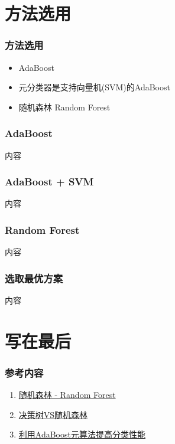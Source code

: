 \documentclass[aspectratio=43, 12pt, utf8, mathserif]{ctexbeamer} %
\begin{document}
\section{方法选用}
\begin{frame}
    \frametitle{方法选用}
    \begin{itemize}
        \item AdaBoost
        \item 元分类器是支持向量机(SVM)的AdaBoost
        \item 随机森林 Random Forest
    \end{itemize}
\end{frame}

\begin{frame}
    \frametitle{AdaBoost}
    内容
\end{frame}

\begin{frame}
    \frametitle{AdaBoost + SVM}
    内容
\end{frame}

\begin{frame}
    \frametitle{Random Forest}
    内容
\end{frame}

\begin{frame}
    \frametitle{选取最优方案}
    内容
\end{frame}

\section{写在最后}
\begin{frame}
    \frametitle{参考内容}
    \begin{enumerate}
        \item \href{https://zhuanlan.zhihu.com/p/44695084}{随机森林 - Random Forest}
        \item \href{https://www.jiqizhixin.com/articles/2020-06-11-6}{决策树VS随机森林}
        \item \href{https://blog.csdn.net/baidu_31657889/article/details/93891552?utm_source=app&app_version=4.7.1}{利用AdaBoost元算法提高分类性能}
    \end{enumerate}
\end{frame}

\begin{frame}
\end{frame}
\end{document}

